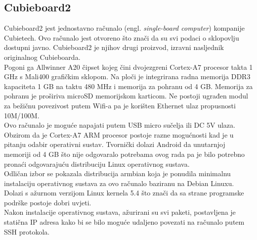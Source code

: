 \documentclass[times, utf8, zavrsni]{fer}
\begin{document}
\subsection{Cubieboard2}
Cubieboard2 jest jednostavno računalo (engl. \emph{single-board computer}) kompanije Cubietech. Ovo računalo jest otvoreno
što znači da su svi podaci o sklopovlju dostupni javno. Cubieboard2 je njihov drugi proizvod, izravni nasljednik originalnog Cubieboarda.\\
Pogoni ga Allwinner A20 čipset kojeg čini dvojezgreni Cortex-A7 procesor takta 1 GHz s Mali400 grafičkim sklopom. 
Na ploči je integrirana radna memorija DDR3 kapaciteta 1 GB na taktu 480 MHz i memorija za pohranu od 4 GB. Memorija za pohranu je 
proširiva microSD memorijskom karticom.
Ne postoji ugrađen modul za bežičnu povezivost putem Wifi-a pa je korišten Ethernet ulaz propusnosti 10M/100M. \\
Ovo računalo je moguće napajati putem USB micro sučelja ili DC 5V ulaza. \\
Obzirom da je Cortex-A7 ARM procesor postoje razne mogućnosti kad je u pitanju odabir operativni sustav. Tvornički dolazi
Android da unutarnjoj memoriji od 4 GB što nije odgovaralo potrebama ovog rada pa je bilo potrebno pronaći odgovarajuću distribuciju
Linux operativnog sustava.\\ Odličan izbor se pokazala distribucija armbian koja je ponudila minimalnu instalaciju operativnog sustava
za ovo računalo baziranu na Debian Linuxu. Dolazi s ažurnom verzijom Linux kernela 5.4 što znači da sa strane programske podrške
postoje dobri uvjeti. \\
Nakon instalacije operativnog sustava, ažurirani su svi paketi, postavljena je statična IP adresa kako bi se bilo moguće udaljeno
povezati na računalo putem SSH protokola. 
\end{document}
